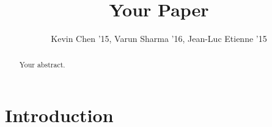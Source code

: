 \documentclass[12pt, twocolumn]{article}
\title{Your Paper}
\author{Kevin Chen '15, Varun Sharma '16, Jean-Luc Etienne '15}
\begin{document}
\maketitle

\begin{abstract}
Your abstract.
\end{abstract}

\section{Introduction}
\end{document}
